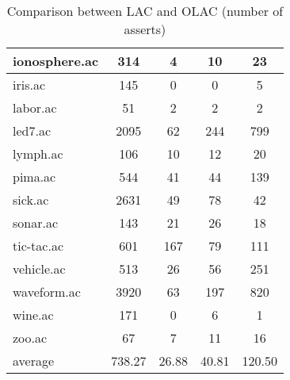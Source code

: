 \begin{table}[htbp]
\begin{tabular}{|l|c|c|c|c|}
		\hline
		ionosphere.ac   & 314           & 4                  & 10                       & 23                            \\
		\hline
		iris.ac         & 145           & 0                  & 0                        & 5                             \\
		\hline
		labor.ac        & 51            & 2                  & 2                        & 2                             \\
		\hline
		led7.ac         & 2095          & 62                 & 244                      & 799                           \\
		\hline
		lymph.ac        & 106           & 10                 & 12                       & 20                            \\
		\hline
		pima.ac         & 544           & 41                 & 44                       & 139                           \\
		\hline
		sick.ac         & 2631          & 49                 & 78                       & 42                            \\
		\hline
		sonar.ac        & 143           & 21                 & 26                       & 18                            \\
		\hline
		tic-tac.ac      & 601           & 167                & 79                       & 111                           \\
		\hline
		vehicle.ac      & 513           & 26                 & 56                       & 251                           \\
		\hline
		waveform.ac     & 3920          & 63                 & 197                      & 820                           \\
		\hline
		wine.ac         & 171           & 0                  & 6                        & 1                             \\
		\hline
		zoo.ac          & 67            & 7                  & 11                       & 16                            \\
		\hline
		average         & 738.27        & 26.88              & 40.81                    & 120.50                        \\
		\hline
		\end{tabular}
	\caption{Comparison between LAC and OLAC (number of asserts)}
	\label{tab:comparison_lac_olac}
\end{table}